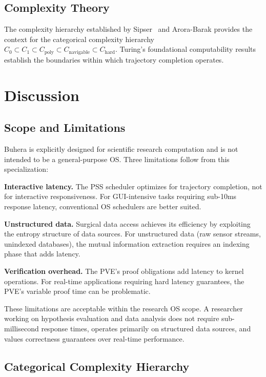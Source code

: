 \documentclass[12pt,twocolumn]{article}
\begin{document}
\subsection{Complexity Theory}

The complexity hierarchy established by Sipser~\cite{sipser2012introduction} and Arora-Barak provides the context for the categorical complexity hierarchy $C_0 \subset C_1 \subset C_{\text{poly}} \subset C_{\text{navigable}} \subset C_{\text{hard}}$. Turing's foundational computability results~\cite{turing1936computable} establish the boundaries within which trajectory completion operates.

\section{Discussion}
\label{sec:discussion}

\subsection{Scope and Limitations}

Buhera is explicitly designed for scientific research computation and is not intended to be a general-purpose OS. Three limitations follow from this specialization:

\textbf{Interactive latency.} The PSS scheduler optimizes for trajectory completion, not for interactive responsiveness. For GUI-intensive tasks requiring sub-10ms response latency, conventional OS schedulers are better suited.

\textbf{Unstructured data.} Surgical data access achieves its efficiency by exploiting the entropy structure of data sources. For unstructured data (raw sensor streams, unindexed databases), the mutual information extraction requires an indexing phase that adds latency.

\textbf{Verification overhead.} The PVE's proof obligations add latency to kernel operations. For real-time applications requiring hard latency guarantees, the PVE's variable proof time can be problematic.

These limitations are acceptable within the research OS scope. A researcher working on hypothesis evaluation and data analysis does not require sub-millisecond response times, operates primarily on structured data sources, and values correctness guarantees over real-time performance.

\subsection{Categorical Complexity Hierarchy}
\end{document}
